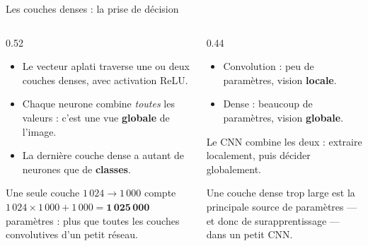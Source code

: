 \begin{frame}{Les couches denses : la prise de décision}
\begin{columns}[t]
\begin{column}{0.52\textwidth}
\begin{itemize}
  \item Le vecteur aplati traverse une ou deux couches denses, avec activation
  ReLU.
  \item Chaque neurone combine \emph{toutes} les valeurs : c'est une vue
  \textbf{globale} de l'image.
  \item La dernière couche dense a autant de neurones que de \textbf{classes}.
\end{itemize}
\begin{ebox}
Une seule couche $1\,024 \to 1\,000$ compte
$1\,024 \times 1\,000 + 1\,000 = \mathbf{1\,025\,000}$ paramètres : plus que
toutes les couches convolutives d'un petit réseau.
\end{ebox}
\end{column}
\begin{column}{0.44\textwidth}
\begin{kbox}
\begin{itemize}
  \item Convolution : peu de paramètres, vision \textbf{locale}.
  \item Dense : beaucoup de paramètres, vision \textbf{globale}.
\end{itemize}
Le CNN combine les deux : extraire localement, puis décider globalement.
\end{kbox}
\begin{wbox}
Une couche dense trop large est la principale source de paramètres --- et donc
de surapprentissage --- dans un petit CNN.
\end{wbox}
\end{column}
\end{columns}
\end{frame}

